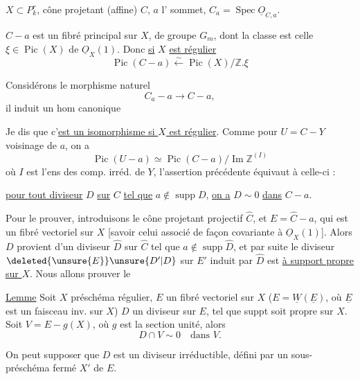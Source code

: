 $X\subset P_k^{r}$, cône projetant (affine) $C$, $a$ l' sommet, $C_a=\operatorname{Spec}\underline O_{C,a}$.

$C-a$ est un fibré principal sur $X$, de groupe $G_m$, dont la classe est celle $\xi\in\operatorname{Pic}(X)$ de $\underline O_X(1)$. Donc \uline{si} $X$ \uline{est régulier}
\[
\operatorname{Pic}(C-a)\xleftarrow{\sim}\operatorname{Pic}(X)/\mathbb Z.\xi
\]

Considérons le morphisme naturel
\[
C_a-a\longrightarrow C-a,
\]
il induit un hom canonique

Je dis que c'\uline{est un isomorphisme si $X$ est régulier}. Comme pour $U=C-Y$ voisinage de $a$, on a
\[
\operatorname{Pic}(U-a)\simeq\operatorname{Pic}(C-a)/\operatorname{Im}\mathbb Z^{(I)}
\]
où $I$ est l'ens des comp. irréd. de $Y$,
l'assertion précédente équivaut à celle-ci :

\uline{pour tout diviseur} $D$ \uline{sur} $C$ \uline{tel que} $a\notin\operatorname{supp}D$, \uline{on a} $D\sim 0$ \uline{dans} $C-a$.

Pour le prouver, introduisons le cône projetant projectif $\widehat C$, et $E=\widehat C-a$, qui est un fibré vectoriel sur $X$ [savoir celui associé de façon covariante à $\underline O_X(1)$]. Alors $D$ provient d'un diviseur $\widehat D$ sur $\widehat C$ tel que $a\notin\operatorname{supp}\widehat D$, et par suite le  diviseur $\deleted{\unsure{E}}\unsure{D'|D}$ sur $E'$ induit par $\widehat D$ est \uline{à support propre} \uline{sur $X$}. Nous allons prouver le

\uline{Lemme} Soit $X$ préschéma régulier, $E$ un fibré vectoriel  sur $X$ ($E=\underline W(\underline E)$, où $\underline E$ est un faisceau inv. sur $X$) $D$ un diviseur sur $E$, tel que suppt
soit propre sur $X$.  Soit $V=E-g(X)$, où $g$ est la section unité, alors
\[
D\cap V\sim0\quad\text{dans }V.
\]

On peut supposer que $D$ est un diviseur irréductible, défini par un sous-préschéma fermé $X'$ de $E$. 

